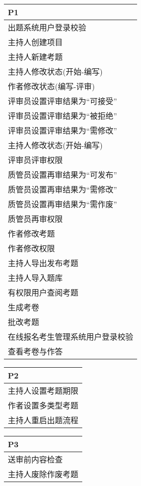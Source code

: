 \documentclass[hyperref, a4paper]{ctexart}
\begin{document}
\begin{enumerate}
  \begin{tabular}{|p{10cm}|}
  \hline
  P1\\
  \hline
  出题系统用户登录校验\\
  \hline
  主持人创建项目\\
  \hline
  主持人新建考题\\
  \hline
  主持人修改状态(开始-编写)\\
  \hline
  作者修改状态(编写-评审) \\
  \hline
  评审员设置评审结果为“可接受” \\
  \hline
  评审员设置评审结果为“被拒绝”\\
  \hline
  评审员设置评审结果为“需修改” \\
  \hline
  主持人修改状态(开始-编写)\\
  \hline
  评审员评审权限\\
  \hline
  质管员设置再审结果为“可发布” \\
  \hline
  质管员设置再审结果为“需修改” \\
  \hline
  质管员设置再审结果为“需作废”\\
  \hline
  质管员再审权限\\
  \hline
  作者修改考题\\
  \hline
  作者修改权限\\
  \hline
  主持人导出发布考题\\
  \hline
  主持人导入题库\\
  \hline
  有权限用户查阅考题\\
  \hline
  生成考卷\\
  \hline
  批改考题\\
  \hline
  在线报名考生管理系统用户登录校验\\
  \hline
  查看考卷与作答\\
  \hline
  \end{tabular}
\end{enumerate}

\begin{tabular}{|p{10cm}|}
\hline
P2\\
\hline
主持人设置考题期限\\
\hline
作者设置多类型考题\\
\hline
主持人重启出题流程\\
\hline
\end{tabular}

\begin{tabular}{|p{10cm}|}
\hline
P3\\
\hline
送审前内容检查\\
\hline
主持人废除作废考题\\
\hline
\end{tabular}
\end{document}
